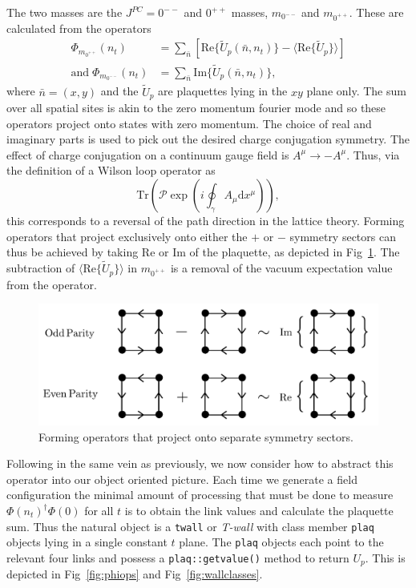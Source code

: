 \documentclass[12pt]{article}
\begin{document}
\par The two masses are the $J^{PC} = 0^{--}$ and $0^{++}$ masses, $m_{0^{--}}$ and $m_{0^{++}}$. These are calculated from the operators
\begin{align}
    \Phi_{m_{0^{++}}}(n_t) &= \sum_{\bar{n}} \left[  \mathrm{Re}\{\tilde{U}_p(\bar{n},n_t)\} - \langle \mathrm{Re}\{\tilde{U}_p\} \rangle \right]\\
    \mathrm{and} \; \Phi_{m_{0^{--}}}(n_t) &= \sum_{\bar{n}}  \mathrm{Im}\{\tilde{U}_p(\bar{n},n_t)\},
\end{align}
where $\bar{n} = (x,y)$ and the $\tilde{U}_p$ are plaquettes lying in the $xy$ plane only. The sum over all spatial sites is akin to the zero momentum fourier mode and so these operators project onto states with zero momentum. The choice of real and imaginary parts is used to pick out the desired charge conjugation symmetry. The effect of charge conjugation on a continuum gauge field is $A^{\mu} \rightarrow -A^{\mu}$. Thus, via the definition of a Wilson loop operator as
\begin{equation}
    \mathrm{Tr}\left(\mathcal{P}\exp\left(i\oint_{\gamma}A_{\mu}\mathrm{d}x^{\mu}\right)\right),
\end{equation}
this corresponds to a reversal of the path direction in the lattice theory. Forming operators that project exclusively onto either the $+$ or $-$ symmetry sectors can thus be achieved by taking Re or Im of the plaquette, as depicted in Fig~\ref{fig:reimparts}. The subtraction of $\langle \mathrm{Re}\{\tilde{U}_p\} \rangle$ in $m_{0^{++}}$ is a removal of the vacuum expectation value from the operator.

\begin{figure}
\centering
\includegraphics[width=0.8\linewidth]{reimparts.pdf}
\caption{\label{fig:reimparts} Forming operators that project onto separate symmetry sectors.}
\end{figure}


\par Following in the same vein as previously, we now consider how to abstract this operator into our object oriented picture. Each time we generate a field configuration the minimal amount of processing that must be done to measure $\Phi(n_t)^{\dagger}\Phi(0)$ for all $t$ is to obtain the link values and calculate the plaquette sum. Thus the natural object is a \texttt{twall} or \emph{T-wall} with class member \texttt{plaq} objects lying in a single constant $t$ plane. The \texttt{plaq} objects each point to the relevant four links and possess a \texttt{plaq::getvalue()} method to return $U_p$. This is depicted in Fig~\ref{fig:phiops} and Fig~\ref{fig:wallclasses}.
\end{document}
